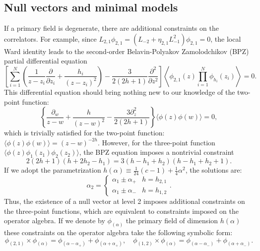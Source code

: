 \documentclass[aps,prb,superscriptaddress,nofootinbib]{revtex4}
\begin{document}
\subsection{Null vectors and minimal models}


If a primary field is degenerate, there are additional constraints on the correlators.
For example, since $L_{2,1}\phi_{2,1}=\left(L_{-2}+\eta_{2,1} L_{-1}^2\right) \phi_{2,1}=0$,
the local Ward identity leads to the second-order Belavin-Polyakov Zamolodchikov (BPZ) partial differential equation
\begin{equation}
	\left[\sum_{i=1}^N\left(\frac{1}{z-z_i} \frac{\partial}{\partial z_i}+\frac{h_i}{\left(z-z_i\right)^2}\right)-\frac{3}{2(2h+1)} \frac{\partial^2}{\partial z^2}\right]
	\left\langle \phi_{2,1}(z) \prod_{i=1}^N \phi_{h_i}(z_i)\right\rangle=0 .
\end{equation}
This differential equation should bring nothing new to our knowledge of the two-point function:
\begin{equation}
	\left\{\frac{\partial_w}{z-w}+\frac{h}{(z-w)^2}-\frac{3\partial_z^2}{2(2 h +1)} \right\}\langle\phi(z) \phi(w)\rangle=0,
\end{equation}
which is trivially satisfied for the two-point function: $\langle\phi(z) \phi(w)\rangle=(z-w)^{-2 h}$.
However, for the three-point function $\langle\phi(z) \phi_1(z_1) \phi_2(z_2)\rangle$, the BPZ equation imposes a nontrivial constraint
\begin{equation}
	2(2 h+1)\left(h+2 h_2-h_1\right)=3\left(h-h_1+h_2\right)\left(h-h_1+h_2+1\right).
\end{equation}
If we adopt the parametrization $h(\alpha) \equiv \frac{1}{24}(c-1)+\frac{1}{4} \alpha^2$, the solutions are: 
\begin{equation}
	\alpha_2 = \begin{cases}
		\alpha_1 \pm \alpha_+ & h = h_{2,1} \\
		\alpha_1 \pm \alpha_- & h = h_{1,2}
	\end{cases}.
\end{equation}
Thus, the existence of a null vector at level 2 imposes additional constraints on the three-point functions, which are equivalent to constraints imposed on the operator algebra.
If we denote by $\phi_{(\alpha)}$ the primary field of dimension $h(\alpha)$ these constraints on the operator algebra take the following symbolic form:
\begin{equation}\label{eq:cft-ladder-1}
	\phi_{(2,1)} \times \phi_{(\alpha)} = \phi_{(\alpha-\alpha_{+})} + \phi_{(\alpha+\alpha_{+})}, \quad
	\phi_{(1,2)} \times \phi_{(\alpha)} = \phi_{(\alpha-\alpha_{-})} + \phi_{(\alpha+\alpha_{-})}.
\end{equation}
\end{document}
